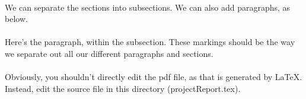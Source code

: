 \documentclass[11pt,twoside,letterpaper]{article}
\begin{document}
  \paragraph{}
  We can separate the sections into subsections. We can also add
  paragraphs, as below.
    
  \paragraph{}
  Here's the paragraph, within the subsection. These markings should
  be the way we separate out all our different paragraphs and
  sections.

  \paragraph{}
  Obviously, you shouldn't directly edit the pdf file, as that is
  generated by LaTeX. Instead, edit the source file in this directory
  (projectReport.tex).



  
\end{document}
